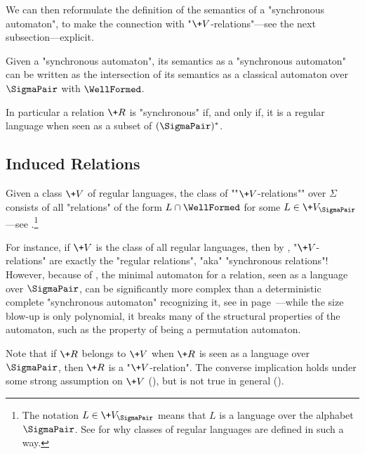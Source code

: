 We can then reformulate the definition of the semantics of a "synchronous automaton",
to make the connection with "$\+V$-relations"---see the next subsection---explicit.

\begin{fact}
	\label{fact:synchronous-is-regular}
	Given a "synchronous automaton", its semantics as a "synchronous automaton"
	can be written as the intersection of its semantics as a classical automaton over $\SigmaPair$
	with $\WellFormed$.
\end{fact}

In particular a relation $\+R$ is "synchronous" if, and only if, it is a regular language when seen as a subset of $(\SigmaPair)^*$.

\subsection{Induced Relations}

Given a class $\+V$ of regular languages,
the class of \AP""$\+V$-relations"" over $\Sigma$ consists of all "relations"
of the form $L \cap \WellFormed$ for some $L \in \+V_{\SigmaPair}$---see .\footnote{The notation $L \in \+V_{\SigmaPair}$ means that $L$ is a language over
the alphabet $\SigmaPair$. See \cite[introduction of \S{}XIII.1]{pin_mathematical_2022}
for why classes of regular languages are defined in such a way.}

For instance, if $\+V$ is the class of all regular languages, then by
, "$\+V$-relations" are exactly the "regular relations", "aka" "synchronous relations"!
However, because of
, the minimal automaton for a relation, seen as a language over $\SigmaPair$,
can be significantly more complex than a deterministic complete "synchronous automaton" recognizing it, see  in page~\pageref{fig:min-auto}---while the size blow-up is only polynomial, it breaks many of the structural properties of the automaton, such as the property of being a permutation automaton.

Note that if $\+R$ belongs to $\+V$ when $\+R$ is seen as a language over $\SigmaPair$,
then $\+R$ is a "$\+V$-relation".
The converse implication holds under some strong assumption on $\+V$ (),
but is not true in general ().

